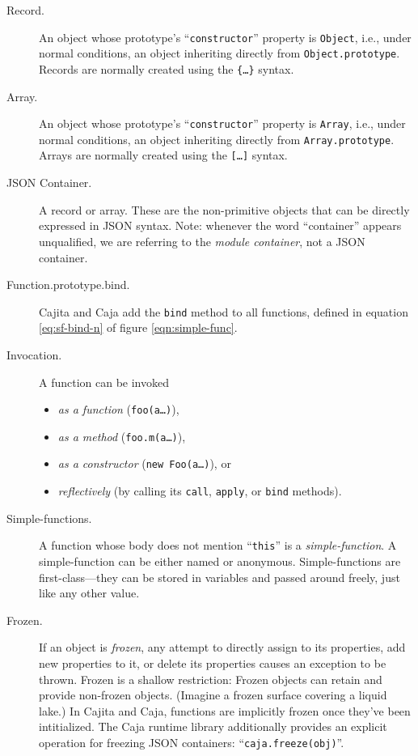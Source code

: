 \documentclass[letterpaper,twocolumn,10pt]{article}
\newcommand{\code}[1]{{\tt {#1}}}              %
\begin{document}
\begin{description}

  \item[Record.] An object whose prototype's ``\code{constructor}'' property is \code{Object}, i.e., under normal 
  conditions, an object inheriting directly from \code{Object.prototype}. Records are normally created using the 
  \code{\{\ldots\}} syntax.

  \item[Array.] An object whose prototype's ``\code{constructor}'' property is \code{Array}, i.e., under normal 
  conditions, an object inheriting directly from \code{Array.prototype}. Arrays are normally created using the 
  \code{[\ldots]} syntax.

  \item[JSON Container.] A record or array. These are the non-primitive objects that can be directly expressed in 
  JSON syntax.  Note: whenever the word ``container'' appears unqualified, we are referring to the \emph{module
  container}, not a JSON container.
  
  \item[Function.prototype.bind.] Cajita and Caja add the \code{bind} method to all functions, defined in equation
  \ref{eq:sf-bind-n} of figure \ref{eqn:simple-func}.
  
  \item[Invocation.] A function can be invoked
  \begin{itemize}
    \item \emph{as a function} (\code{foo(a\ldots)}),
    \item \emph{as a method} (\code{foo.m(a\ldots)}),
    \item \emph{as a constructor} (\code{new Foo(a\ldots)}), or
    \item \emph{reflectively} (by calling its \code{call}, \code{apply}, or \code{bind} methods).
  \end{itemize}

  \item[Simple-functions.] A function whose body does not mention ``\code{this}'' is a \emph{simple-function}. A 
  simple-function can be either named or anonymous. Simple-functions are first-class---they can be stored in 
  variables and passed around freely, just like any other value.
  
  \item[Frozen.] If an object is \emph{frozen}, any attempt to directly assign to its properties, add new properties 
  to it, or delete its properties causes an exception to be thrown. Frozen is a shallow restriction: Frozen objects 
  can retain and provide non-frozen objects. (Imagine a frozen surface covering a liquid lake.) In Cajita and Caja, functions  
  are implicitly frozen once they've been intitialized. The Caja runtime library additionally provides an explicit 
  operation for freezing JSON containers: ``\code{caja.freeze(obj)}''.
  

\end{description}
\end{document}
